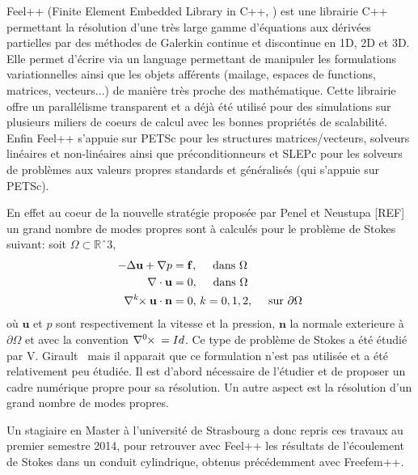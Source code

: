 \documentclass[12pt]{article}
\newcommand{\curlk}[1][k]{\ensuremath{\nabla^{#1}\hspace{-.3em}\times}\xspace}
\begin{document}
Feel++ (Finite Element Embedded Library in C++, \cite{PRUDHOMME:2012:HAL-00662868:3,feelpp098:10046} ) est une librairie C++
permettant la résolution d'une très large gamme d'équations aux dérivées
partielles par des méthodes de Galerkin continue et discontinue en 1D, 2D et
3D. Elle permet d'écrire via un language permettant de manipuler les
formulations variationnelles ainsi que les objets afférents (mailage, espaces de
functions, matrices, vecteurs...) de manière très proche des mathématique. Cette
librairie offre un parallélisme transparent et a déjà été utilisé pour des
simulations sur plusieurs miliers de coeurs de calcul avec les bonnes propriétés
de scalabilité. Enfin Feel++ s'appuie sur PETSc pour les structures
matrices/vecteurs, solveurs linéaires et non-linéaires ainsi que
préconditionneurs et SLEPc pour les solveurs de problèmes aux valeurs propres
standards et généralisés (qui s'appuie sur PETSc).

En effet au coeur de la nouvelle stratégie proposée par Penel et Neustupa [REF]
un grand nombre de modes propres sont à calculés pour le problème de Stokes
suivant: soit $\Omega \subset \mathbb{R}ˆ3$,
\begin{align}
  \label{eq:1}
  -\Delta \mathbf{u} + \nabla p &= \mathbf{f},\quad \mbox{ dans } \Omega\\
  \nabla \cdot \mathbf{u} &= 0,\quad \mbox{ dans } \Omega\\
  \curlk{} \mathbf{u} \cdot \mathbf{n} &= 0,\, k=0,1,2,\quad \mbox{ sur
  } \partial \Omega
\end{align}
où $\mathbf{u}$ et $p$ sont respectivement la vitesse et la pression,
$\mathbf{n}$ la normale exterieure à $\partial \Omega$ et avec la convention
$\curlk[0]{} = Id$. Ce type de problème de Stokes a été étudié par
V. Girault~\cite{girault90-1} mais il apparait que ce formulation n'est pas
utilisée et a été relativement peu étudiée. Il  est d'abord nécessaire de
l'étudier et de proposer un cadre numérique propre pour sa résolution. Un autre
aspect est la résolution d'un grand nombre de modes propres.

Un stagiaire en Master à l’université de Strasbourg a donc repris ces travaux au
premier semestre 2014, pour retrouver avec Feel++ les résultats de l’écoulement
de Stokes dans un conduit cylindrique, obtenus précédemment avec Freefem++.
\end{document}
